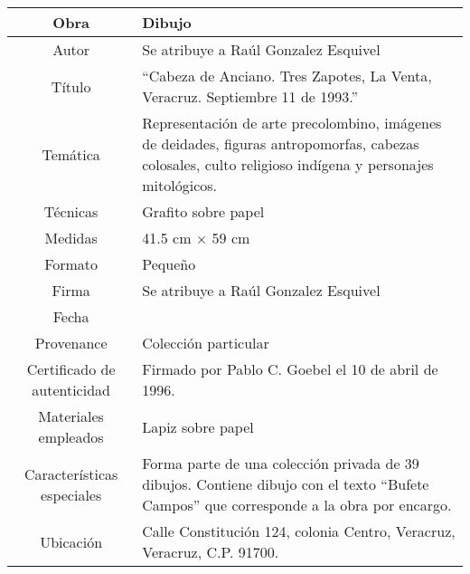 \documentclass[10pt,letter]{report}
\begin{document}
\begin{table}[H]
\centering
\begin{tabular}{|c|m{}|}
\hline
Obra& Dibujo	\\
\hline
Autor & Se atribuye a Ra\'ul Gonzalez Esquivel\\
\hline
T\'itulo & ``Cabeza de Anciano. Tres Zapotes, La Venta, Veracruz. Septiembre 11 de 1993.'' \\
\hline
Tem\'atica & Representaci\'on de arte precolombino, im\'agenes de deidades, figuras antropomorfas, cabezas colosales, culto religioso ind\'igena y personajes mitol\'ogicos.\\
\hline
T\'ecnicas &Grafito sobre papel \\
\hline
Medidas & 41.5 cm $\times$ 59 cm \\
\hline
 Formato & Peque\~no \\
 \hline
 Firma & Se atribuye a Ra\'ul Gonzalez Esquivel \\
 \hline
  Fecha & \\
 \hline
 Provenance & Colecci\'on particular\\
 \hline
 Certificado de autenticidad& Firmado por Pablo C. Goebel el 10 de abril de 1996.  \\
 \hline 
  Materiales empleados & Lapiz sobre papel\\
 \hline
 Caracter\'isticas especiales & Forma parte de una colecci\'on privada de 39 dibujos. 
Contiene dibujo con el texto ``Bufete Campos'' que corresponde a la obra por encargo. \\
\hline 
Ubicaci\'on & Calle Constituci\'on 124, colonia Centro, Veracruz, Veracruz, C.P. 91700.\\
\hline

\end{tabular}
\end{table}
\end{document}
